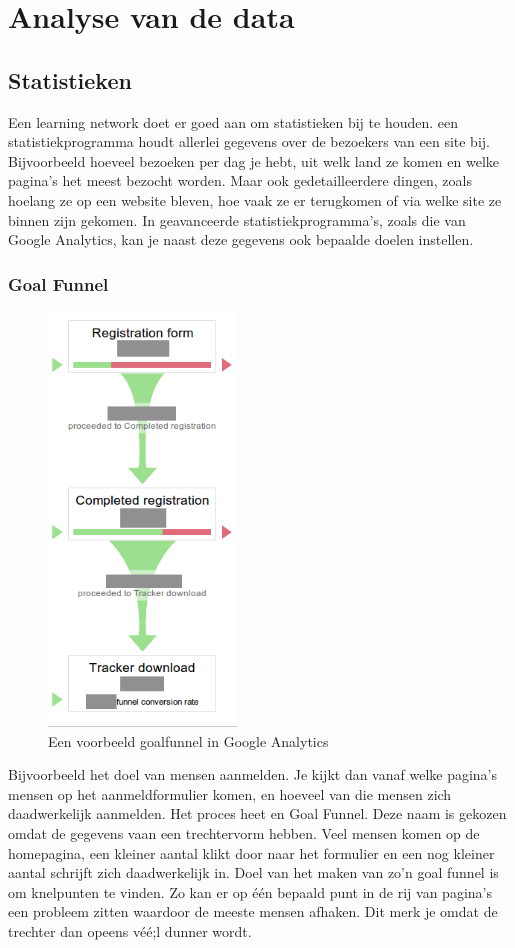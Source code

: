 \documentclass[a4paper, 10pt, pdftex]{report}
\begin{document}
  \chapter{Analyse van de data}
    \label{datachapter}
    \newpage
    \section{Statistieken}
    Een learning network doet er goed aan om statistieken bij te houden. een statistiekprogramma houdt allerlei gegevens over de bezoekers van een site bij. Bijvoorbeeld hoeveel bezoeken per dag je hebt, uit welk land ze komen en welke pagina's het meest bezocht worden. Maar ook gedetailleerdere dingen, zoals hoelang ze op een website bleven, hoe vaak ze er terugkomen of via welke site ze binnen zijn gekomen. In geavanceerde statistiekprogramma's, zoals die van Google Analytics, kan je naast deze gegevens ook bepaalde doelen instellen.

    \subsection{Goal Funnel}
      \begin{figure}
      \caption{Een voorbeeld goalfunnel in Google Analytics}
        \includegraphics[width=50mm]{../images/goalfunnel}
    \end{figure}

    Bijvoorbeeld het doel van mensen aanmelden. Je kijkt dan vanaf welke pagina's mensen op het aanmeldformulier komen, en hoeveel van die mensen zich daadwerkelijk aanmelden. Het proces heet en Goal Funnel. Deze naam is gekozen omdat de gegevens vaan een trechtervorm hebben. Veel mensen komen op de homepagina, een kleiner aantal klikt door naar het formulier en een nog kleiner aantal schrijft zich daadwerkelijk in. Doel van het maken van zo'n goal funnel is om knelpunten te vinden. Zo kan er op \'e\'en bepaald punt in de rij van pagina's een probleem zitten waardoor de meeste mensen afhaken. Dit merk je omdat de trechter dan opeens v\'e\'e;l dunner wordt.
\end{document}
